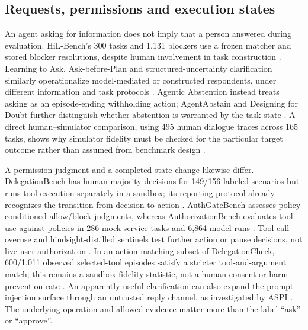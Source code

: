 \subsection{Requests, permissions and execution states}
An agent asking for information does not imply that a person answered during evaluation. HiL-Bench's 300 tasks and 1,131 blockers use a frozen matcher and stored blocker resolutions, despite human involvement in task construction \cite{ref14}. Learning to Ask, Ask-before-Plan and structured-uncertainty clarification similarly operationalize model-mediated or constructed respondents, under different information and task protocols \cite{ref23,ref26,ref41}. Agentic Abstention instead treats asking as an episode-ending withholding action; AgentAbstain and Designing for Doubt further distinguish whether abstention is warranted by the task state \cite{ref15,ref32,ref33}. A direct human--simulator comparison, using 495 human dialogue traces across 165 tasks, shows why simulator fidelity must be checked for the particular target outcome rather than assumed from benchmark design \cite{ref44}.

A permission judgment and a completed state change likewise differ. DelegationBench has human majority decisions for 149/156 labeled scenarios but runs tool execution separately in a sandbox; its reporting protocol already recognizes the transition from decision to action \cite{ref12}. AuthGateBench assesses policy-conditioned allow/block judgments, whereas AuthorizationBench evaluates tool use against policies in 286 mock-service tasks and 6,864 model runs \cite{ref13,ref24}. Tool-call overuse and hindsight-distilled sentinels test further action or pause decisions, not live-user authorization \cite{ref42,ref25}. In an action-matching subset of DelegationCheck, 600/1,011 observed selected-tool episodes satisfy a stricter tool-and-argument match; this remains a sandbox fidelity statistic, not a human-consent or harm-prevention rate \cite{ref12}. An apparently useful clarification can also expand the prompt-injection surface through an untrusted reply channel, as investigated by ASPI \cite{ref31}. The underlying operation and allowed evidence matter more than the label \enquote{ask} or \enquote{approve}.

